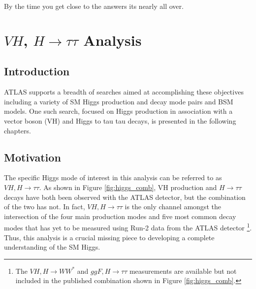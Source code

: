 \begin{savequote}[75mm]
By the time you get close to the answers its nearly all over.
\end{savequote}

\chapter{$VH$, $H\rightarrow \tau\tau$ Analysis}

\section{Introduction}
 ATLAS supports a breadth of searches aimed at accomplishing these objectives including a variety of SM Higgs production and decay mode pairs and BSM models. One such search, focused on Higgs production in association with a vector boson (VH) and Higgs to tau tau decays, is presented in the following chapters.

\section{Motivation}
The specific Higgs mode of interest in this analysis can be referred to as $VH, H\rightarrow\tau\tau$. As shown in Figure \ref{fig:higgs_comb}, VH production and $H\rightarrow \tau\tau$ decays have both been observed  with the ATLAS detector, but the combination of the two has not. In fact, $VH,H\rightarrow\tau\tau$ is the only channel amongst the intersection of the four main production modes and five most common decay modes that has yet to be measured using Run-2 data from the ATLAS detector \cite{higgs_comb_paper}\footnote{The $VH,H\rightarrow WW^*$\cite{vh_hww_run2} and $ggF,H\rightarrow\tau\tau$\cite{htautau_run2} measurements are available but not included in the published combination shown in Figure \ref{fig:higgs_comb}.}. Thus, this analysis is a crucial missing piece to developing a complete understanding of the SM Higgs.\\

